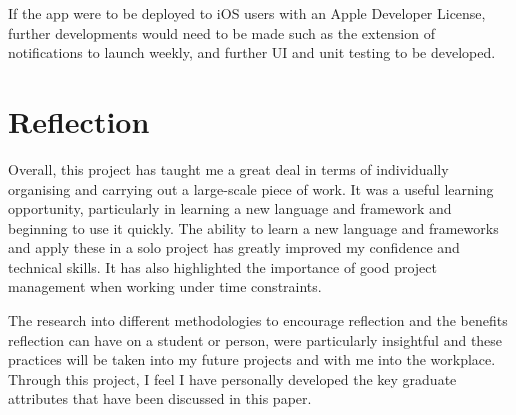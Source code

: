 \documentclass{l4proj}
\begin{document}
If the app were to be deployed to iOS users with an Apple Developer License, further developments would need to be made such as the extension of notifications to launch weekly, and further UI and unit testing to be developed. 

\section{Reflection}

Overall, this project has taught me a great deal in terms of individually organising and carrying out a large-scale piece of work. It was a useful learning opportunity, particularly in learning a new language and framework and beginning to use it quickly. The ability to learn a new language and frameworks and apply these in a solo project has greatly improved my confidence and technical skills. It has also highlighted the importance of good project management when working under time constraints. 

The research into different methodologies to encourage reflection and the benefits reflection can have on a student or person, were particularly insightful and these practices will be taken into my future projects and with me into the workplace. Through this project, I feel I have personally developed the key graduate attributes that have been discussed in this paper.

%
% 
\end{document}
